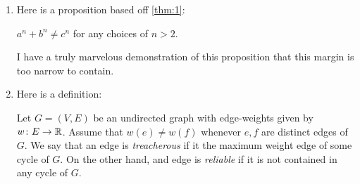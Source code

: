 \documentclass{article}
\begin{document}
\begin{enumerate}
  \item \label{qst:6}
    Here is a proposition based off \autoref{thm:1}:
    \begin{proposition}\label{prp:1}
      $a^n + b^n \neq c^n$ for any choices of $n > 2$.
    \end{proposition}
    \begin{proof*}
      I have a truly marvelous demonstration of this proposition that
      this margin is too narrow to contain.
    \end{proof*}

  \item \label{qst:7}
    Here is a definition:
    \begin{definition}
      Let $G = (V, E)$ be an undirected graph with edge-weights given
      by $w \colon E \rightarrow \operatorname*{\mathbb{R}}$. Assume that $w(e) \neq w(f)$
      whenever $e, f$ are distinct edges of $G$. We say that an edge
      is {\it treacherous} if it the maximum weight edge of some cycle
      of $G$. On the other hand, and edge is {\it reliable} if it is
      not contained in any cycle of $G$.
    \end{definition}
\end{enumerate}
\end{document}
